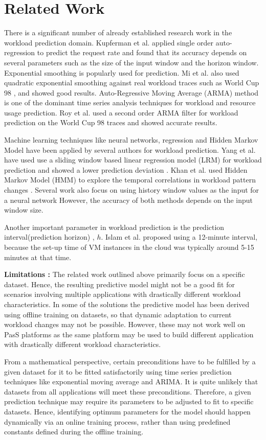 \section{Related Work}

There is a significant number of already established research work in the workload prediction domain.  Kupferman et al. \cite{Kupferman_2009} applied single order auto-regression to predict the request rate and found that its accuracy depends on several parameters such as the size of the input window and the horizon window. Exponential smoothing is popularly used for prediction. Mi et al. \cite{Mi_2010} also used quadratic exponential smoothing against real workload traces such as World Cup 98 \cite{WorldCup_1998}, and showed good results. Auto-Regressive Moving Average (ARMA) method is one of the dominant time series analysis techniques for workload and resource usage prediction. Roy et al. \cite{Roy_2011} used a second order ARMA filter for workload prediction on the World Cup 98 traces and showed accurate results.  

Machine learning techniques like neural networks, regression and Hidden Markov Model have been applied by several authors for workload prediction. Yang et al.\cite{Yang_2013} have used use a sliding window based linear regression model (LRM) for workload prediction and showed a lower prediction deviation  . Khan et al. \cite{Khan_2012} used Hidden Markov Model (HMM) to explore the temporal correlations in workload pattern changes . Several work also focus on using history window values as the input for a neural network \cite{Islam_2012} However, the accuracy of both methods depends on the input window size.


Another important parameter in workload prediction is the prediction interval(prediction horizon) , $h$. Islam et al. \cite{Islam_2012} proposed using a 12-minute interval, because the set-up time of VM instances in the cloud was typically around 5-15 minutes at that time. 

\textbf{Limitations :} The related work outlined above primarily focus on a specific dataset. Hence, the resulting predictive model might not be a good fit for scenarios involving multiple applications with drastically different workload characteristics. In some of the solutions the predictive model has been derived using offline training on datasets, so that dynamic adaptation to current workload changes may not be possible. However, these may not work well on PasS platforms as the same platform may be used to build different application with drastically different workload characteristics.

From a mathematical perspective, certain preconditions have to be fulfilled by a given dataset for it to be fitted satisfactorily using time series prediction techniques like exponential moving average and ARIMA. It is quite unlikely that datasets from all applications will meet these preconditions. Therefore, a given prediction technique may require its parameters to be adjusted to fit to specific datasets. Hence, identifying optimum parameters for the model should happen dynamically via an online training process, rather than using predefined constants defined during the offline training.